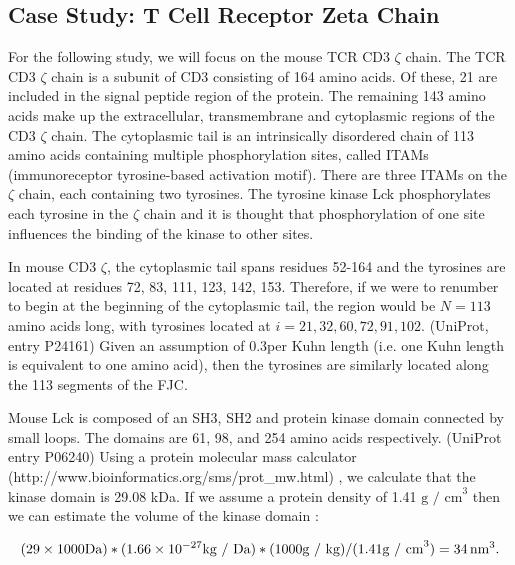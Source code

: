 \documentclass[../AdvancementSummary.tex]{subfiles}
\begin{document}
\subsection{Case Study: T Cell Receptor Zeta Chain}
\label{sec:ModelDevsubsec:TCR}
For the following study, we will focus on the mouse TCR CD3 $\zeta$ chain. The TCR CD3 $\zeta$ chain is a subunit of CD3 consisting of 164 amino acids.  Of these, 21 are included in the signal peptide region of the protein.  The remaining 143 amino acids make up the extracellular, transmembrane and cytoplasmic regions of the CD3 $\zeta$ chain.  The cytoplasmic tail is an intrinsically disordered chain of 113 amino acids containing multiple phosphorylation sites, called ITAMs (immunoreceptor tyrosine-based activation motif). There are three ITAMs on the $\zeta$ chain, each containing two tyrosines. The tyrosine kinase Lck phosphorylates each tyrosine in the $\zeta$ chain and it is thought that phosphorylation of one site influences the binding of the kinase to other sites.  

In mouse CD3 $\zeta$, the cytoplasmic tail spans residues 52-164 and the tyrosines are located at residues 72, 83, 111, 123, 142, 153.  Therefore, if we were to renumber to begin at the beginning of the cytoplasmic tail, the region would be $N=113$ amino acids long, with tyrosines located at $i= 21, 32, 60, 72, 91, 102$.  (UniProt, entry P24161)  Given an assumption of 0.3\nm per Kuhn length (i.e. one Kuhn length is equivalent to one amino acid), then the tyrosines are similarly located along the 113 segments of the FJC.

Mouse Lck is composed of an SH3, SH2 and protein kinase domain connected by small loops. The domains are 61, 98, and 254 amino acids respectively. (UniProt entry P06240)  Using a protein molecular mass calculator (http://www.bioinformatics.org/sms/prot\_mw.html) , we calculate that the kinase domain is 29.08 kDa.  If we assume a protein density of 1.41 $\mbox{g / cm}^3$ then we can estimate the volume of the kinase domain \cite{Fischer2004}:

\begin{equation*}
(29 \times 1000 \mbox{Da}) * (1.66\times10^{-27} \mbox{kg / Da}) * (1000 \mbox{g / kg}) / (1.41 \mbox{g / cm}^3) = 34 \,\mbox{nm}^3.
\end{equation*}
\end{document}
